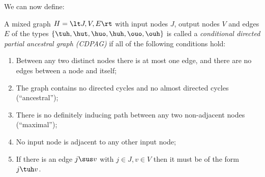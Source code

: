 We can now define:
\begin{Def}\label{def:dpag}
  A mixed graph $H = \lt J,V,E\rt$ with input nodes $J$, output nodes $V$ and edges $E$ of the types $\{\tuh,\hut,\huo,\huh,\ouo,\ouh\}$ is called a \emph{conditional directed partial ancestral graph (CDPAG)} if all of the following conditions hold:
  \begin{enumerate}
    \item Between any two distinct nodes there is at most one edge, and there are no edges between a node and itself;
    \item The graph contains no directed cycles and no almost directed cycles (``ancestral'');
    \item There is no definitely inducing path between any two non-adjacent nodes (``maximal'');
    \item No input node is adjacent to any other input node;
    \item If there is an edge $j \sus v$ with $j \in J, v \in V$ then it must be of the form $j \tuh v$.
  \end{enumerate}
\end{Def}

